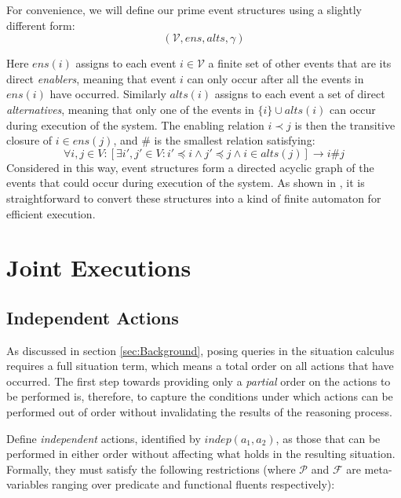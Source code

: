 For convenience, we will define our prime event structures using a
slightly different form:\[
(\mathcal{V},ens,alts,\gamma)\]


Here $ens(i)$ assigns to each event $i\in\mathcal{V}$ a finite set
of other events that are its direct \emph{enablers}, meaning that
event $i$ can only occur after all the events in $ens(i)$ have occurred.
Similarly $alts(i)$ assigns to each event a set of direct \emph{alternatives},
meaning that only one of the events in $\{i\}\cup alts(i)$ can occur
during execution of the system. The enabling relation $i\prec j$
is then the transitive closure of $i\in ens(j)$, and $\#$ is the
smallest relation satisfying:\[
\forall i,j\in V:[\exists i',j'\in V:i'\preceq i\wedge j'\preceq j\wedge i\in alts(j)]\rightarrow i\#j\]
 Considered in this way, event structures form a directed acyclic
graph of the events that could occur during execution of the system.
As shown in \citep{pratt91modeling_conc_with_geom}, it is straightforward
to convert these structures into a kind of finite automaton for efficient
execution.


\section{Joint Executions}

\label{sec:Joint-Execs}


\subsection{Independent Actions}

As discussed in section \ref{sec:Background}, posing queries in the
situation calculus requires a full situation term, which means a total
order on all actions that have occurred. The first step towards providing
only a \emph{partial} order on the actions to be performed is, therefore,
to capture the conditions under which actions can be performed out
of order without invalidating the results of the reasoning process.

Define \emph{independent} actions, identified by $indep(a_{1},a_{2})$,
as those that can be performed in either order without affecting what
holds in the resulting situation. Formally, they must satisfy the
following restrictions (where $\mathcal{P}$ and $\mathcal{F}$ are
meta-variables ranging over predicate and functional fluents respectively):

